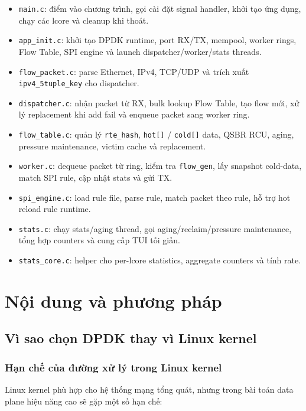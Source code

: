 \documentclass[12pt,a4paper]{report}
\DeclareRobustCommand{\code}[1]{{\small\texttt{#1}}}
\begin{document}
\begin{itemize}
    \item \code{main.c}: điểm vào chương trình, gọi cài đặt signal handler, khởi tạo ứng dụng, chạy các lcore và cleanup khi thoát.
    \item \code{app\_init.c}: khởi tạo DPDK runtime, port RX/TX, mempool, worker rings, Flow Table, SPI engine và launch dispatcher/worker/stats threads.
    \item \code{flow\_packet.c}: parse Ethernet, IPv4, TCP/UDP và trích xuất \code{ipv4\_5tuple\_key} cho dispatcher.
    \item \code{dispatcher.c}: nhận packet từ RX, bulk lookup Flow Table, tạo flow mới, xử lý replacement khi add fail và enqueue packet sang worker ring.
    \item \code{flow\_table.c}: quản lý \code{rte\_hash}, \code{hot[]} / \code{cold[]} data, QSBR RCU, aging, pressure maintenance, victim cache và replacement.
    \item \code{worker.c}: dequeue packet từ ring, kiểm tra \code{flow\_gen}, lấy snapshot cold-data, match SPI rule, cập nhật stats và gửi TX.
    \item \code{spi\_engine.c}: load rule file, parse rule, match packet theo rule, hỗ trợ hot reload rule runtime.
    \item \code{stats.c}: chạy stats/aging thread, gọi aging/reclaim/pressure maintenance, tổng hợp counters và cung cấp TUI tối giản.
    \item \code{stats\_core.c}: helper cho per-lcore statistics, aggregate counters và tính rate.
\end{itemize}


\chapter{Nội dung và phương pháp}

\section{Vì sao chọn DPDK thay vì Linux kernel}

\subsection{Hạn chế của đường xử lý trong Linux kernel}

Linux kernel phù hợp cho hệ thống mạng tổng quát, nhưng trong bài toán data plane hiệu năng cao sẽ gặp một số hạn chế:
\end{document}
